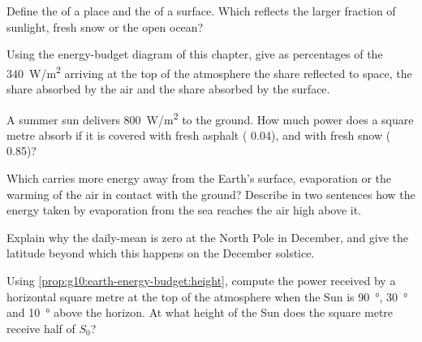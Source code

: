 \begin{exercise}[$\star$]\label{exo:g10:earth-energy-budget:1}
Define the  of a place and the  of a surface. Which reflects
the larger fraction of sunlight, fresh snow or the open ocean?
\end{exercise}

\begin{exercise}[$\star$]\label{exo:g10:earth-energy-budget:2}
Using the energy-budget diagram of this chapter, give as percentages of the
\qty{340}{W/m^2} arriving at the top of the atmosphere the share reflected
to space, the share absorbed by the air and the share absorbed by the
surface.
\end{exercise}

\begin{exercise}[$\star$]\label{exo:g10:earth-energy-budget:3}
A summer sun delivers \qty{800}{W/m^2} to the ground. How much power does a
square metre absorb if it is covered with fresh asphalt ( 0.04), and
with fresh snow ( 0.85)?
\end{exercise}

\begin{exercise}[$\star$]\label{exo:g10:earth-energy-budget:4}
Which carries more energy away from the Earth's surface, evaporation or the
warming of the air in contact with the ground? Describe in two sentences how
the energy taken by evaporation from the sea reaches the air high above it.
\end{exercise}

\begin{exercise}[$\star$]\label{exo:g10:earth-energy-budget:5}
Explain why the daily-mean  is zero at the North Pole in December,
and give the latitude beyond which this happens on the December solstice.
\end{exercise}

\begin{exercise}[$\star\star$]\label{exo:g10:earth-energy-budget:6}
Using \cref{prop:g10:earth-energy-budget:height}, compute the power received
by a horizontal square metre at the top of the atmosphere when the Sun is
\qty{90}{\degree}, \qty{30}{\degree} and \qty{10}{\degree} above the horizon.
At what height of the Sun does the square metre receive half of $S_0$?
\end{exercise}

